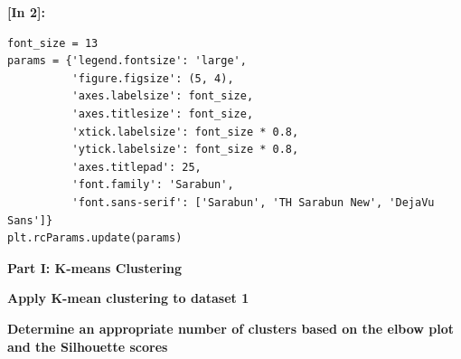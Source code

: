 \vspace{0.4em}
\noindent\textbf{\small [In 2]:}
\begin{lstlisting}[style=pycode]
font_size = 13
params = {'legend.fontsize': 'large',
          'figure.figsize': (5, 4),
          'axes.labelsize': font_size,
          'axes.titlesize': font_size,
          'xtick.labelsize': font_size * 0.8,
          'ytick.labelsize': font_size * 0.8,
          'axes.titlepad': 25,
          'font.family': 'Sarabun',
          'font.sans-serif': ['Sarabun', 'TH Sarabun New', 'DejaVu Sans']}
plt.rcParams.update(params)
\end{lstlisting}

\vspace{0.3em}
\begin{tcolorbox}[colback=gray!5!white,colframe=gray!50!black,boxrule=0.5pt,arc=2pt,left=4pt,right=4pt,top=2pt,bottom=2pt,unbreakable,before upper={\sloppy\raggedright}]
{\small\bfseries Part I: K-means Clustering\par}
\end{tcolorbox}

\vspace{0.3em}
\begin{tcolorbox}[colback=gray!5!white,colframe=gray!50!black,boxrule=0.5pt,arc=2pt,left=4pt,right=4pt,top=2pt,bottom=2pt,unbreakable,before upper={\sloppy\raggedright}]
{\small\bfseries Apply K-mean clustering to dataset 1\par}
\end{tcolorbox}

\vspace{0.3em}
\begin{tcolorbox}[colback=gray!5!white,colframe=gray!50!black,boxrule=0.5pt,arc=2pt,left=4pt,right=4pt,top=2pt,bottom=2pt,unbreakable,before upper={\sloppy\raggedright}]
{\small\bfseries Determine an appropriate number of clusters based on the elbow plot and the Silhouette scores\par}
\end{tcolorbox}

